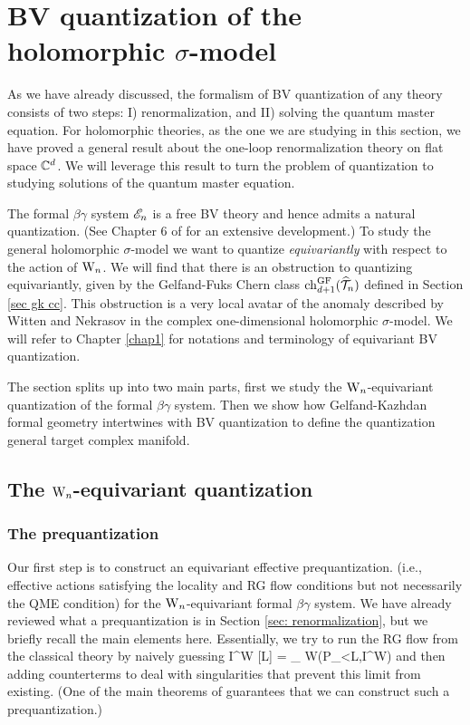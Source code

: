 \documentclass[10pt]{amsart}
\begin{document}
\section{BV quantization of the holomorphic $\sigma$-model}

As we have already discussed, the formalism of BV quantization of any theory consists of two steps: I) renormalization, and II) solving the quantum master equation. 
For holomorphic theories, as the one we are studying in this section, we have proved a general result about the one-loop renormalization theory on flat space $\mathbb C^d$. 
We will leverage this result to turn the problem of quantization to studying solutions of the quantum master equation.

The formal $\beta\gamma$ system $\mathscr E_n$ is a free BV theory and hence admits a natural quantization.
(See Chapter 6 of \cite{GwThesis} for an extensive development.)  
To study the general holomorphic $\sigma$-model we want to quantize \emph{equivariantly} with respect to the action of ${{\rm W}_n}$.
We will find that there is an obstruction to quantizing equivariantly, 
given by the Gelfand-Fuks Chern class ${\rm ch}_{d+1}^{{\rm GF}}(\widehat{\mathcal T}_n)$ defined in Section \ref{sec gk cc}. 
This obstruction is a very local avatar of the anomaly described by Witten and Nekrasov \cite{WittenCDO,Nek} in the complex one-dimensional holomorphic $\sigma$-model.
We will refer to Chapter \ref{chap1} for notations and terminology of equivariant BV quantization.

The section splits up into two main parts, first we study the ${{\rm W}_n}$-equivariant quantization of the formal $\beta\gamma$ system.
Then we show how Gelfand-Kazhdan formal geometry intertwines with BV quantization to define the quantization general target complex manifold. 

\subsection{The ${{\rm W}_n}$-equivariant quantization}

\subsubsection{The prequantization}

Our first step is to construct an equivariant effective prequantization.
(i.e., effective actions satisfying the locality and RG flow conditions but not necessarily the QME condition)
for the ${{\rm W}_n}$-equivariant formal $\beta\gamma$ system.
We have already reviewed what a prequantization is in Section \ref{sec: renormalization}, but we briefly recall the main elements here.
Essentially, we try to run the RG flow from the classical theory by naively guessing
\be\label{w prequant}
I^{\rm W} [L] = \lim_{\epsilon {}} W(P_{\epsilon<L},I^{\rm W})
\ee
and then adding counterterms to deal with singularities that prevent this limit from existing.
(One of the main theorems of \cite{CosBook} guarantees that we can construct such a prequantization.)
\end{document}
